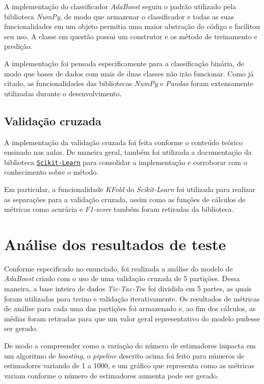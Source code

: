 \documentclass{article}
\begin{document}
A implementação do classificador \textit{AdaBoost} seguiu o padrão utilizado
pela biblioteca \textit{NumPy}, de modo que armazenar o classificador e todas
as suas funcionalidades em um objeto permitia uma maior abstração do código e
facilitou seu uso. A classe em questão possui um construtor e os método de
treinamento e predição.

A implementação foi pensada especificamente para a classificação binária, de
modo que bases de dados com mais de duas classes não irão funcionar. Como já
citado, as funcionalidades das bibliotecas \textit{NumPy} e \textit{Pandas}
foram extensamente utilizadas durante o desenvolvimento.

\subsection{Validação cruzada}

A implementação da validação cruzada foi feita conforme o conteúdo teórico
ensinado nas aulas. De maneira geral,
também foi utilizada a documentação da biblioteca
\href{https://scikit-learn.org/stable/modules/cross_validation.html}{\texttt{Scikit-Learn}}
para consolidar a implementação e corroborar com o conhecimento sobre o método.

Em particular, a funcionalidade \textit{KFold} do \textit{Scikit-Learn} foi
utilizada
para realizar as separações para a validação cruzada, assim como as funções de
cálculos de
métricas como acurácia e \textit{F1-score} também foram retiradas da
biblioteca.

\section{Análise dos resultados de teste}

Conforme especificado no enunciado, foi realizada a análise do modelo de
\textit{AdaBoost} criado com
o uso de uma validação cruzada de 5 partições. Dessa maneira, a base inteira de
dados \textit{Tic-Tac-Toe}
foi dividida em 5 partes, as quais foram utilizadas para treino e validação
iterativamente. Os resultados de métricas
de análise para cada uma das partições foi armazenado e, ao fim dos cálculos,
as médias foram retiradas para que um valor geral representativo
do modelo pudesse ser gerado.

De modo a compreender como a variação do número de estimadores impacta em um
algoritmo de \textit{boosting},
o \textit{pipeline} descrito acima foi feito para números de estimadores
variando de 1 a 1000, e um gráfico que
representa como as métricas variam conforme o número de estimadores aumenta
pode ser gerado.
\end{document}
